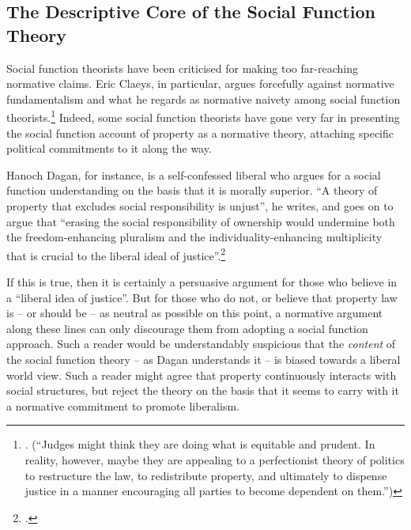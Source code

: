\subsection{The Descriptive Core of the Social Function Theory}

Social function theorists have been criticised for making too far-reaching normative claims. Eric Claeys, in particular, argues forcefully against normative fundamentalism and what he regards as normative naivety among social function theorists.\footnote{\cite[945]{claeys09}. (``Judges might think they are doing what is equitable and prudent. In reality, however, maybe they are appealing to a perfectionist theory of politics to restructure the law, to redistribute property, and ultimately to dispense justice in a manner encouraging all parties to become dependent on them.'')} Indeed, some social function theorists have gone very far in presenting the social function account of property as a normative theory, attaching specific political commitments to it along the way.

Hanoch Dagan, for instance, is a self-confessed liberal who argues for a social function understanding on the basis that it is morally superior. ``A theory of property that excludes social responsibility is unjust'', he writes, and goes on to argue that ``erasing the social responsibility of ownership would undermine both the freedom-enhancing pluralism and the individuality-enhancing multiplicity that is crucial to the liberal ideal of justice''.\footcite[1259]{dagan07}

If this is true, then it is certainly a persuasive argument for those who believe in a ``liberal idea of justice''. But for those who do not, or believe that property law is -- or should be -- as neutral as possible on this point, a normative argument along these lines can only discourage them from adopting a social function approach. Such a reader would be understandably suspicious that the {\it content} of the social function theory -- as Dagan understands it -- is biased towards a liberal world view. Such a reader might agree that property continuously interacts with social structures, but reject the theory on the basis that it seems to carry with it a normative commitment to promote liberalism.

